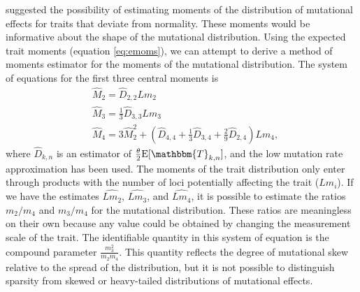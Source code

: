 \citet{Schraiber2015} suggested the possibility of estimating moments of the 
distribution of mutational effects for traits that deviate from normality. These
moments would be informative about the shape of the mutational distribution.
Using the expected trait moments (equation \eqref{eq:emoms}), we can attempt to
derive a method of moments estimator for the moments of the mutational
distribution. The system of equations for the first three central moments is
\begin{align}
\label{eq:genearch}
  &\widehat{M}_2 = \widehat{D}_{2,2}Lm_2 \nonumber \\
  &\widehat{M}_3 = \frac{1}{3}\widehat{D}_{3,3}Lm_3 \nonumber \\
  &\widehat{M}_4 = 3\widehat{M}_2^2 + (\widehat{D}_{4,4} +
  \frac{1}{3} \widehat{D}_{3,4} + \frac{2}{9} \widehat{D}_{2,4})Lm_4,
\end{align}
where $\hat{D}_{k,n}$ is an estimator of $\T \E[\mathbbm{T}_{k,n}]$, and the low
mutation rate approximation has been used. The moments of the trait distribution
only enter through products with the number of loci potentially affecting the
trait ($Lm_i$). If we have the estimates $\widehat{Lm_2}$, $\widehat{Lm_3}$, and
$\widehat{Lm_4}$, it is possible to estimate the ratios $m_2/m_4$ and $m_3/m_4$
for the mutational distribution. These ratios are meaningless on their own
because any value could be obtained by changing the measurement scale of the
trait. The identifiable quantity in this system of equation is the compound
parameter $\frac{m_3^2}{m_2m_4}$. This quantity reflects the degree of
mutational skew relative to the spread of the distribution, but it is not
possible to distinguish sparsity from skewed or heavy-tailed distributions of
mutational effects.

